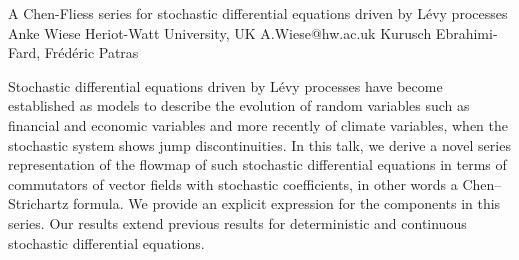 \begin{talk}
  {A Chen-Fliess series for stochastic differential equations driven by L{\'e}vy processes}%
  {Anke Wiese}%
  {Heriot-Watt University, UK}%
  {A.Wiese@hw.ac.uk}%
  {Kurusch Ebrahimi-Fard, Fr{\'e}d{\'e}ric Patras}%
  
    

Stochastic differential equations driven by L{\'e}vy processes have become established as models to describe the evolution of random variables such as financial and economic variables and more recently of climate variables, when the stochastic system shows jump discontinuities. In this talk, we derive a novel series representation of the flowmap of such stochastic 
differential equations 
in terms of commutators of vector fields with stochastic 
coefficients, in other words a Chen--Strichartz formula. We provide an explicit expression for the components in this series. 
Our results extend previous results
for deterministic and continuous stochastic differential equations.  
\end{talk}

